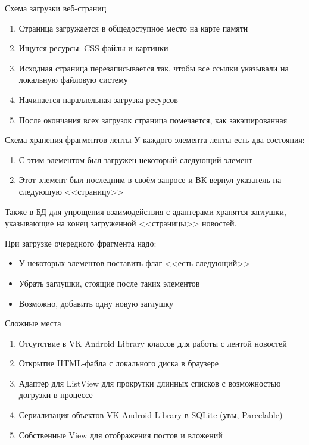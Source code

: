 \documentclass[utf8,xcolor=table]{beamer}
\begin{document}
\begin{frame}[t]{Схема загрузки веб-страниц}
	\begin{enumerate}
		\item Страница загружается в общедоступное место на карте памяти
		\item Ищутся ресурсы: CSS-файлы и картинки
		\item Исходная страница перезаписывается так, чтобы все ссылки указывали на локальную файловую систему
		\item Начинается параллельная загрузка ресурсов
		\item После окончания всех загрузок страница помечается, как закэшированная
	\end{enumerate}
\end{frame}

\begin{frame}[t]{Схема хранения фрагментов ленты}
	У каждого элемента ленты есть два состояния:
	\begin{enumerate}
		\item С этим элементом был загружен некоторый следующий элемент
		\item Этот элемент был последним в своём запросе и ВК вернул указатель на следующую <<страницу>>
	\end{enumerate}
	Также в БД для упрощения взаимодействия с адаптерами хранятся заглушки, указывающие на конец
	загруженной <<страницы>> новостей.

	При загрузке очередного фрагмента надо:
	\begin{itemize}
		\item У некоторых элементов поставить флаг <<есть следующий>>
		\item Убрать заглушки, стоящие после таких элементов
		\item Возможно, добавить одну новую заглушку
	\end{itemize}
\end{frame}

\begin{frame}[t]{Сложные места}
	\begin{enumerate}
		\item Отсутствие в VK Android Library классов для работы с лентой новостей
		\item Открытие HTML-файла с локального диска в браузере
		\item Адаптер для ListView для прокрутки длинных списков с возможностью догрузки в процессе
		\item Сериализация объектов VK Android Library в SQLite (увы, Parcelable)
		\item Собственные View для отображения постов и вложений
	\end{enumerate}
\end{frame}
\end{document}
